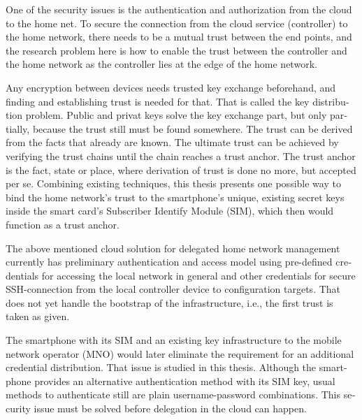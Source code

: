 \documentclass[12pt,a4paper,english]{tutthesis}
\begin{document}
\begin{otherlanguage}{english}
One of the security issues is the authentication and authorization 
from the cloud to the home net.
To secure the connection from the cloud service (controller)
to the home network, there needs to be a mutual trust between the end
points, and the research problem here is how to enable the trust between the
controller and the home network as the controller lies at the edge of the
home network.



Any encryption between devices needs trusted key exchange beforehand,
and finding and establishing trust is needed for that.  That is called
the key distribution problem. Public and privat keys solve the key exchange part, but
only partially, because the trust still must be found somewhere.
The trust can be derived from the facts that already are known.  
The ultimate trust can be achieved by verifying the trust chains 
until the chain reaches a trust anchor.
The trust anchor is the fact, state or place,
where derivation of trust is done no more, but accepted per se.
Combining existing techniques, this thesis presents one possible way
to bind the home network's trust to the smartphone's unique, existing
secret keys inside the smart card's Subscriber Identify Module (SIM),
which then would function as a trust anchor. 



The above mentioned cloud solution for delegated home network
management currently has preliminary authentication and access model
using pre-defined credentials for accessing the local network in general and other
credentials for secure SSH-connection from the local
controller device to configuration
targets\cite[Chap.4]{silverajan2015collaborative}.
That does not yet handle the bootstrap of the infrastructure, 
i.e., the first trust is taken as given. 

The smartphone with its SIM and an
existing key infrastructure to the mobile
network operator (MNO) would later eliminate the requirement for an
additional credential distribution. That issue is studied in this
thesis.  Although the smartphone provides an alternative authentication
method with its SIM key, usual methods to authenticate still are plain
username-password combinations.  This security issue must be solved
before delegation in the cloud can happen.












\end{otherlanguage}
\end{document}
